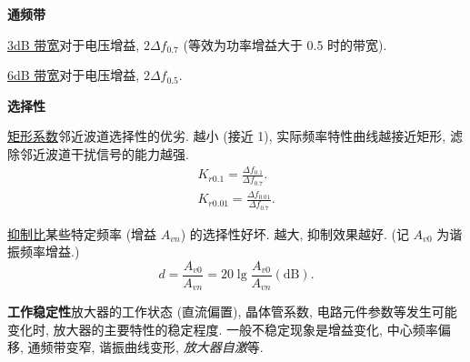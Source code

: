 \textbf{通频带}

\underline{3dB 带宽}\quad 对于电压增益, $2\Delta f_{0.7}$ (等效为功率增益大于 0.5 时的带宽).

\underline{6dB 带宽}\quad 对于电压增益, $2\Delta f_{0.5}$.

\textbf{选择性}

\underline{矩形系数}\quad 邻近波道选择性的优劣. 越小 (接近 1), 实际频率特性曲线越接近矩形, 滤除邻近波道干扰信号的能力越强.
\begin{gather}
    K_{r0.1}=\frac{\Delta f_{0.1}}{\Delta f_{0.7}}. \\
    K_{r0.01}=\frac{\Delta f_{0.01}}{\Delta f_{0.7}}.
\end{gather}

\underline{抑制比}\quad 某些特定频率 (增益 $A_{vn}$) 的选择性好坏. 越大, 抑制效果越好. (记 $A_{v0}$ 为谐振频率增益.)
\begin{equation}
    d=\frac{A_{v0}}{A_{vn}}=20\lg\frac{A_{v0}}{A_{vn}}(\mathrm{dB}).
\end{equation}

\textbf{工作稳定性}\quad 放大器的工作状态 (直流偏置), 晶体管系数, 电路元件参数等发生可能变化时, 放大器的主要特性的稳定程度. 一般不稳定现象是增益变化, 中心频率偏移, 通频带变窄, 谐振曲线变形, \textit{放大器自激}等.
